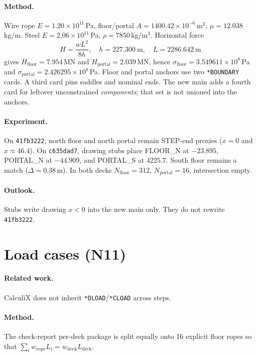 \documentclass[11pt,a4paper]{article}
\begin{document}
\paragraph{Method.}
Wire rope \(E=1.20\times10^{11}\)\,Pa, floor/portal
\(A=1400.42\times10^{-6}\)\,m\(^2\), \(\mu=12.038\)\,kg/m. Steel
\(E=2.06\times10^{11}\)\,Pa, \(\rho=7850\)\,kg/m\(^3\). Horizontal force
\[
H=\frac{wL^2}{8h},\quad h=227.300~\mathrm{m},\quad L=2286.642~\mathrm{m}
\]
gives \(H_{\mathrm{floor}}=7.954\)\,MN and \(H_{\mathrm{portal}}=2.039\)\,MN,
hence \(\sigma_{\mathrm{floor}}=3.549611\times10^{8}\)\,Pa and
\(\sigma_{\mathrm{portal}}=2.426295\times10^{8}\)\,Pa. Floor and portal
anchors use two \texttt{*BOUNDARY} cards. A third card pins saddles and
nominal ends. The new main adds a fourth card for leftover unconstrained
\emph{components}; that set is not unioned into the anchors.

\paragraph{Experiment.}
On \texttt{41fb3222}, north floor and north portal remain STEP-end proxies
(\(x=0\) and \(x\approx 46.4\)). On \texttt{c635dad7}, drawing stubs place
FLOOR\_N at \(-23.895\), PORTAL\_N at \(-44.909\), and PORTAL\_S at
\(4225.7\). South floor remains a match (\(\Delta=0.38\)\,m). In both decks
\(N_{\mathrm{floor}}=312\), \(N_{\mathrm{portal}}=16\), intersection empty.

\paragraph{Outlook.}
Stubs write drawing \(x<0\) into the new main only. They do not rewrite
\texttt{41fb3222}.

\section{Load cases (N11)}
\label{sec:loads}

\paragraph{Related work.}
CalculiX does not inherit \texttt{*DLOAD}/\texttt{*CLOAD} across steps.

\paragraph{Method.}
The check-report per-deck package is split equally onto 16 explicit floor
ropes so that \(\sum_i w_{\mathrm{rope}}L_i=w_{\mathrm{deck}}L_{\mathrm{deck}}\).
\end{document}
